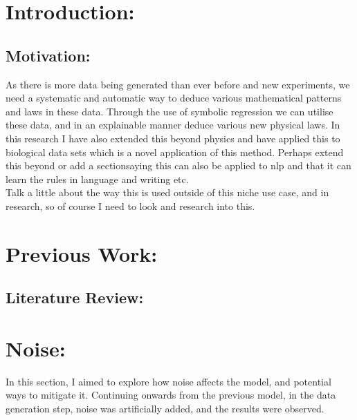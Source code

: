 \documentclass{article}
\begin{document}
\newpage

\tableofcontents 

\newpage
{}



\section{Introduction: }

\subsection{Motivation: }

As there is more data being generated than ever before and new experiments, we need a systematic and automatic way to deduce various mathematical patterns and laws in 
these data. Through the use of symbolic regression we can utilise  these data, and in an explainable manner deduce various new physical laws. In this research I have also extended this beyond physics and have applied this to biological data sets which is a novel application of this method. Perhaps extend this beyond or add a sectionsaying this can also be applied to nlp and that it can learn the rules in language and writing etc. \\ 

Talk a little about the way this is used outside of this niche use case, and in research, so of course I need to look and research into this.\\


\section{Previous Work: }

\subsection{Literature Review: }


\section{Noise: }

In this section, I aimed to explore how noise affects the model, and potential ways to mitigate it. Continuing onwards from the previous model, in the data generation step, noise was artificially added, and the results were observed.\\
\end{document}
